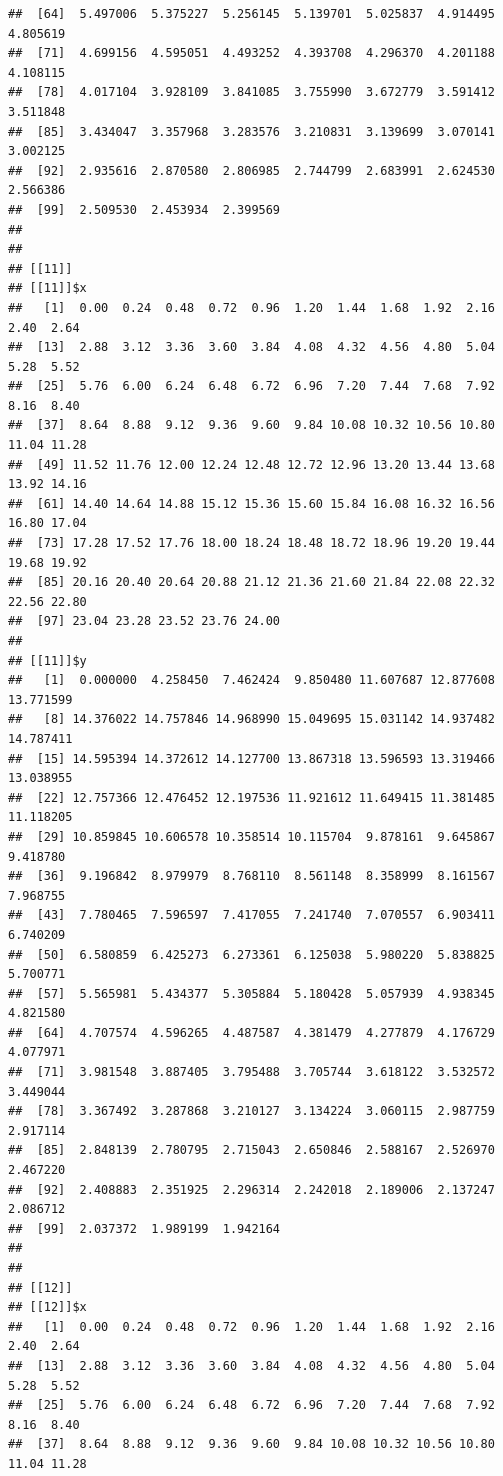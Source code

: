 \documentclass[
  ignorenonframetext,
]{beamer}
\begin{document}
\begin{frame}[fragile]{}
\begin{verbatim}
##  [64]  5.497006  5.375227  5.256145  5.139701  5.025837  4.914495  4.805619
##  [71]  4.699156  4.595051  4.493252  4.393708  4.296370  4.201188  4.108115
##  [78]  4.017104  3.928109  3.841085  3.755990  3.672779  3.591412  3.511848
##  [85]  3.434047  3.357968  3.283576  3.210831  3.139699  3.070141  3.002125
##  [92]  2.935616  2.870580  2.806985  2.744799  2.683991  2.624530  2.566386
##  [99]  2.509530  2.453934  2.399569
## 
## 
## [[11]]
## [[11]]$x
##   [1]  0.00  0.24  0.48  0.72  0.96  1.20  1.44  1.68  1.92  2.16  2.40  2.64
##  [13]  2.88  3.12  3.36  3.60  3.84  4.08  4.32  4.56  4.80  5.04  5.28  5.52
##  [25]  5.76  6.00  6.24  6.48  6.72  6.96  7.20  7.44  7.68  7.92  8.16  8.40
##  [37]  8.64  8.88  9.12  9.36  9.60  9.84 10.08 10.32 10.56 10.80 11.04 11.28
##  [49] 11.52 11.76 12.00 12.24 12.48 12.72 12.96 13.20 13.44 13.68 13.92 14.16
##  [61] 14.40 14.64 14.88 15.12 15.36 15.60 15.84 16.08 16.32 16.56 16.80 17.04
##  [73] 17.28 17.52 17.76 18.00 18.24 18.48 18.72 18.96 19.20 19.44 19.68 19.92
##  [85] 20.16 20.40 20.64 20.88 21.12 21.36 21.60 21.84 22.08 22.32 22.56 22.80
##  [97] 23.04 23.28 23.52 23.76 24.00
## 
## [[11]]$y
##   [1]  0.000000  4.258450  7.462424  9.850480 11.607687 12.877608 13.771599
##   [8] 14.376022 14.757846 14.968990 15.049695 15.031142 14.937482 14.787411
##  [15] 14.595394 14.372612 14.127700 13.867318 13.596593 13.319466 13.038955
##  [22] 12.757366 12.476452 12.197536 11.921612 11.649415 11.381485 11.118205
##  [29] 10.859845 10.606578 10.358514 10.115704  9.878161  9.645867  9.418780
##  [36]  9.196842  8.979979  8.768110  8.561148  8.358999  8.161567  7.968755
##  [43]  7.780465  7.596597  7.417055  7.241740  7.070557  6.903411  6.740209
##  [50]  6.580859  6.425273  6.273361  6.125038  5.980220  5.838825  5.700771
##  [57]  5.565981  5.434377  5.305884  5.180428  5.057939  4.938345  4.821580
##  [64]  4.707574  4.596265  4.487587  4.381479  4.277879  4.176729  4.077971
##  [71]  3.981548  3.887405  3.795488  3.705744  3.618122  3.532572  3.449044
##  [78]  3.367492  3.287868  3.210127  3.134224  3.060115  2.987759  2.917114
##  [85]  2.848139  2.780795  2.715043  2.650846  2.588167  2.526970  2.467220
##  [92]  2.408883  2.351925  2.296314  2.242018  2.189006  2.137247  2.086712
##  [99]  2.037372  1.989199  1.942164
## 
## 
## [[12]]
## [[12]]$x
##   [1]  0.00  0.24  0.48  0.72  0.96  1.20  1.44  1.68  1.92  2.16  2.40  2.64
##  [13]  2.88  3.12  3.36  3.60  3.84  4.08  4.32  4.56  4.80  5.04  5.28  5.52
##  [25]  5.76  6.00  6.24  6.48  6.72  6.96  7.20  7.44  7.68  7.92  8.16  8.40
##  [37]  8.64  8.88  9.12  9.36  9.60  9.84 10.08 10.32 10.56 10.80 11.04 11.28

\end{verbatim}
\end{frame}
\end{document}
